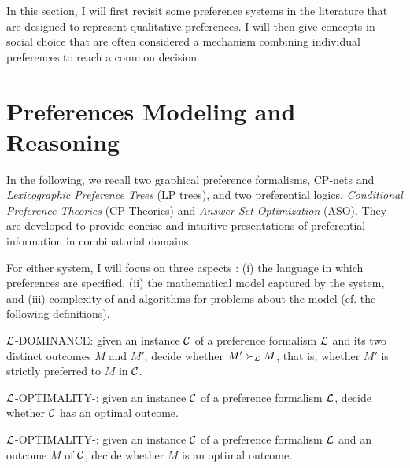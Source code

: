 
In this section, I will first revisit some preference
systems in the literature that are designed to represent
qualitative preferences. I will then give concepts
in social choice that are often considered a mechanism
combining individual preferences to reach a common decision.

\section{Preferences Modeling and Reasoning \label{sec:pref_reasoning}}
In the following, we recall two graphical
preference formalisms, CP-nets and
\textit{Lexicographic Preference Trees} (LP trees),
and two preferential logics,
\textit{Conditional Preference Theories} (CP Theories)
and \textit{Answer Set Optimization} (ASO).
They are developed to provide concise and intuitive
presentations of preferential information in 
combinatorial domains.

For either system, I will focus on three aspects \cite{Domshlak20111037}:
(i) the language in which preferences are specified,
(ii) the mathematical model captured by the system,
and (iii) complexity of and algorithms for
problems about the model (cf. the following definitions).

\begin{definition}
\label{def:dom}
  $\mathcal{L}$-DOMINANCE: given an instance $\mathcal{C}$ of a preference
	formalism $\mathcal{L}$ and its two distinct outcomes
  $M$ and $M'$, decide whether $M' \succ_{\mathcal{L}} M$, that is,
  whether $M'$ is strictly preferred to $M$ in $\mathcal{C}$.
\end{definition}

\begin{definition}
\label{def:opt1}
  $\mathcal{L}$-OPTIMALITY-: given an instance $\mathcal{C}$ of a preference
	formalism $\mathcal{L}$,
  decide whether $\mathcal{C}$ has an optimal outcome.
\end{definition}

\begin{definition}
\label{def:opt2}
  $\mathcal{L}$-OPTIMALITY-: given an instance $\mathcal{C}$ of a preference
	formalism $\mathcal{L}$ and an outcome $M$ of $\mathcal{C}$,
  decide whether $M$ is an optimal outcome.
\end{definition}

